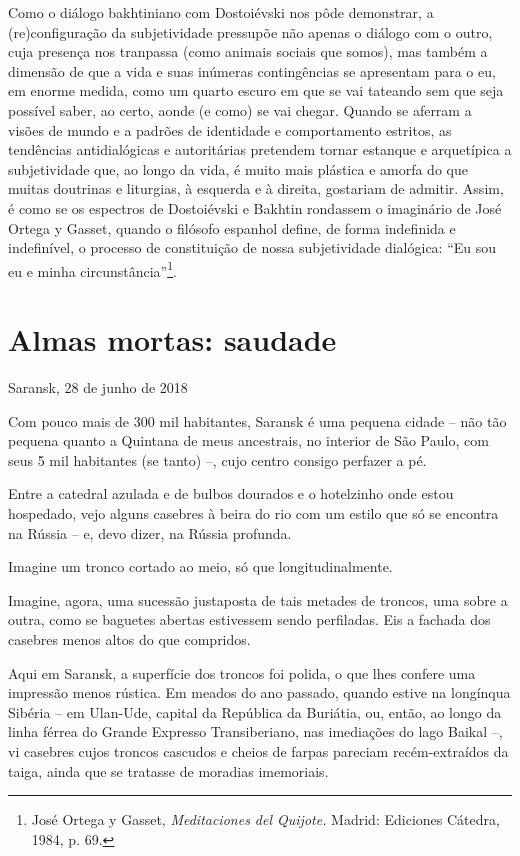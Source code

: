 Como o diálogo bakhtiniano com Dostoiévski nos pôde demonstrar, a
(re)configuração da subjetividade pressupõe não apenas o diálogo com o
outro, cuja presença nos tranpassa (como animais sociais que somos), mas
também a dimensão de que a vida e suas inúmeras contingências se
apresentam para o eu, em enorme medida, como um quarto escuro em que se
vai tateando sem que seja possível saber, ao certo, aonde (e como) se
vai chegar. Quando se aferram a visões de mundo e a padrões de
identidade e comportamento estritos, as tendências antidialógicas e
autoritárias pretendem tornar estanque e arquetípica a subjetividade
que, ao longo da vida, é muito mais plástica e amorfa do que muitas
doutrinas e liturgias, à esquerda e à direita, gostariam de admitir.
Assim, é como se os espectros de Dostoiévski e Bakhtin rondassem o
imaginário de José Ortega y Gasset, quando o filósofo espanhol define,
de forma indefinida e indefinível, o processo de constituição de nossa
subjetividade dialógica: ``Eu sou eu e minha circunstância''\footnote{José
  Ortega y Gasset, \emph{Meditaciones del Quijote.} Madrid: Ediciones
  Cátedra, 1984, p. 69.}.

\chapter*{Almas mortas: saudade}

\begin{flushright}
Saransk, 28 de junho de 2018
\end{flushright}

Com pouco mais de 300 mil habitantes, Saransk é uma pequena cidade --
não tão pequena quanto a Quintana de meus ancestrais, no interior de São
Paulo, com seus 5 mil habitantes (se tanto) --, cujo centro consigo
perfazer a pé.

Entre a catedral azulada e de bulbos dourados e o hotelzinho onde estou
hospedado, vejo alguns casebres à beira do rio com um estilo que só se
encontra na Rússia -- e, devo dizer, na Rússia profunda.

Imagine um tronco cortado ao meio, só que longitudinalmente.

Imagine, agora, uma sucessão justaposta de tais metades de troncos, uma
sobre a outra, como se baguetes abertas estivessem sendo perfiladas. Eis
a fachada dos casebres menos altos do que compridos.

Aqui em Saransk, a superfície dos troncos foi polida, o que lhes confere
uma impressão menos rústica. Em meados do ano passado, quando estive na
longínqua Sibéria -- em Ulan-Ude, capital da República da Buriátia, ou,
então, ao longo da linha férrea do Grande Expresso Transiberiano, nas
imediações do lago Baikal --, vi casebres cujos troncos cascudos e
cheios de farpas pareciam recém-extraídos da taiga, ainda que se
tratasse de moradias imemoriais.


